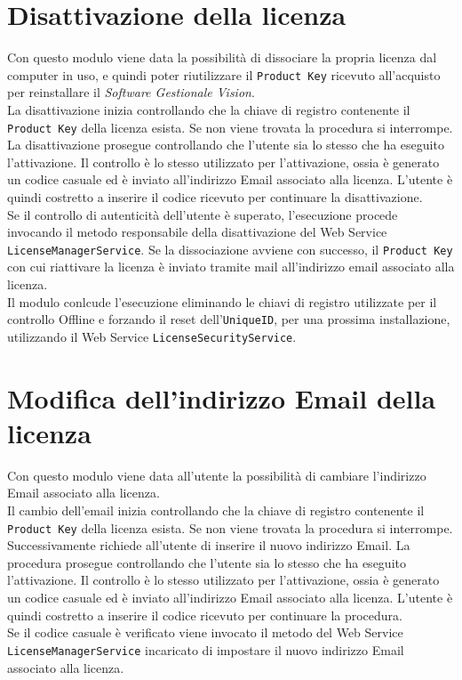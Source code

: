 \section{Disattivazione della licenza}

Con questo modulo viene data la possibilità di dissociare la propria licenza dal computer in uso, e quindi poter riutilizzare il \texttt{Product Key} ricevuto all’acquisto per reinstallare il \textit{Software Gestionale Vision}.\\
La disattivazione inizia controllando che la chiave di registro contenente il \texttt{Product Key} della licenza esista. Se non viene trovata la procedura si interrompe.\\
La disattivazione prosegue controllando che l'utente sia lo stesso che ha eseguito l'attivazione. Il controllo è lo stesso utilizzato per l'attivazione, ossia è generato un codice casuale ed è inviato all'indirizzo Email associato alla licenza. L'utente è quindi costretto a inserire il codice ricevuto per continuare la disattivazione.
\\Se il controllo di autenticità dell'utente è superato, l’esecuzione procede invocando il metodo responsabile della disattivazione del Web Service \texttt{LicenseManagerService}. Se la dissociazione  avviene con successo, il \texttt{Product Key} con cui riattivare la licenza è inviato tramite mail all’indirizzo email associato alla licenza.\\
Il modulo conlcude l'esecuzione eliminando le chiavi di registro utilizzate per il controllo Offline e forzando il reset dell’\texttt{UniqueID}, per una prossima installazione, utilizzando il Web Service \texttt{LicenseSecurityService}. 



\section{Modifica dell'indirizzo Email della licenza}

Con questo modulo viene data all'utente la possibilità di cambiare l'indirizzo Email associato alla licenza.\\
Il cambio dell’email inizia controllando che la chiave di registro contenente il \texttt{Product Key} della licenza esista. Se non viene trovata la procedura si interrompe. Successivamente richiede all'utente di inserire il nuovo indirizzo Email. La procedura prosegue controllando che l'utente sia lo stesso che ha eseguito l'attivazione. Il controllo è lo stesso utilizzato per l'attivazione, ossia è generato un codice casuale ed è inviato all'indirizzo Email associato alla licenza. L'utente è quindi costretto a inserire il codice ricevuto per continuare la procedura.\\
Se il codice casuale è verificato viene invocato il metodo del Web Service\\ \texttt{LicenseManagerService} incaricato di impostare il nuovo indirizzo Email associato alla licenza.


